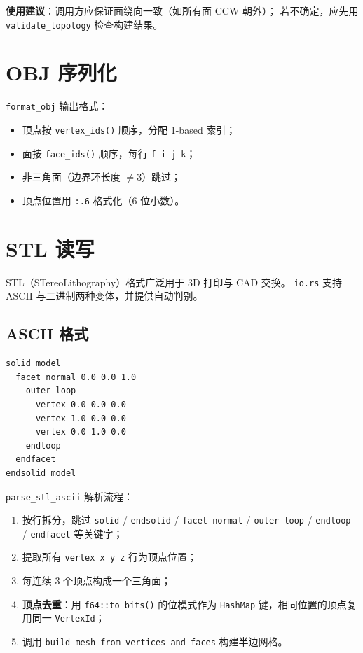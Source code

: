\documentclass[11pt,a4paper]{article}
\begin{document}
\textbf{使用建议}：调用方应保证面绕向一致（如所有面 CCW 朝外）；
若不确定，应先用 \texttt{validate\_topology} 检查构建结果。

\section{OBJ 序列化}

\texttt{format\_obj} 输出格式：
\begin{itemize}
  \item 顶点按 \texttt{vertex\_ids()} 顺序，分配 1-based 索引；
  \item 面按 \texttt{face\_ids()} 顺序，每行 \texttt{f i j k}；
  \item 非三角面（边界环长度 $\ne 3$）跳过；
  \item 顶点位置用 \texttt{{:.6}} 格式化（6 位小数）。
\end{itemize}

\section{STL 读写}

STL（STereoLithography）格式广泛用于 3D 打印与 CAD 交换。
\texttt{io.rs} 支持 ASCII 与二进制两种变体，并提供自动判别。

\subsection{ASCII 格式}

\begin{lstlisting}
solid model
  facet normal 0.0 0.0 1.0
    outer loop
      vertex 0.0 0.0 0.0
      vertex 1.0 0.0 0.0
      vertex 0.0 1.0 0.0
    endloop
  endfacet
endsolid model
\end{lstlisting}

\texttt{parse\_stl\_ascii} 解析流程：
\begin{enumerate}
  \item 按行拆分，跳过 \texttt{solid} / \texttt{endsolid} / \texttt{facet normal} /
        \texttt{outer loop} / \texttt{endloop} / \texttt{endfacet} 等关键字；
  \item 提取所有 \texttt{vertex x y z} 行为顶点位置；
  \item 每连续 3 个顶点构成一个三角面；
  \item \textbf{顶点去重}：用 \texttt{f64::to\_bits()} 的位模式作为 \texttt{HashMap}
        键，相同位置的顶点复用同一 \texttt{VertexId}；
  \item 调用 \texttt{build\_mesh\_from\_vertices\_and\_faces} 构建半边网格。
\end{enumerate}
\end{document}
